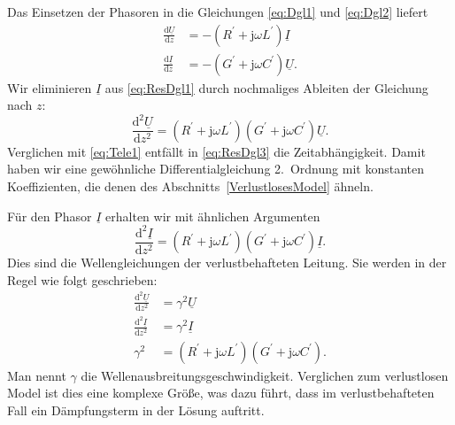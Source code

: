 \documentclass[paper=a4, parskip=half-, ngerman, fontsize=11pt]{scrreprt}
\begin{document}
Das Einsetzen der Phasoren in die Gleichungen \eqref{eq:Dgl1} und \eqref{eq:Dgl2} liefert
\begin{align}
    \frac{\text{d} \underline{U}}{\text{d} z} &= - \left( R^{\prime} + \mathrm{j} \omega L^{\prime} \right)
    \underline{I} \label{eq:ResDgl1} \\[1ex]
    \frac{\text{d} \underline{I}}{\text{d} z} &= - \left( G^{\prime} + \mathrm{j} \omega C^{\prime} \right)
    \underline{U}.
\end{align}
Wir eliminieren $\underline{I}$ aus \eqref{eq:ResDgl1} durch nochmaliges Ableiten der Gleichung nach $z$:
\begin{equation}
    \frac{\text{d}^{2} \underline{U}}{\text{d} z^{2}} = \left( R^{\prime} + \mathrm{j} \omega L^{\prime} \right)
    \left( G^{\prime} + \mathrm{j} \omega C^{\prime} \right) \underline{U} \label{eq:ResDgl3}.
\end{equation}
Verglichen mit \eqref{eq:Tele1} entfällt in \eqref{eq:ResDgl3} die Zeitabhängigkeit. Damit haben wir eine gewöhnliche
Differentialgleichung 2.~Ordnung mit konstanten Koeffizienten, die denen des Abschnitts~\ref{VerlustlosesModel} ähneln.

Für den Phasor $\underline{I}$ erhalten wir mit ähnlichen Argumenten
\begin{equation*}
    \frac{\text{d}^{2} \underline{I}}{\text{d} z^{2}} = \left( R^{\prime} + \mathrm{j} \omega L^{\prime} \right)
    \left( G^{\prime} + \mathrm{j} \omega C^{\prime} \right) \underline{I}.
\end{equation*}
Dies sind die Wellengleichungen der verlustbehafteten Leitung. Sie werden in der Regel wie folgt geschrieben:
\begin{align}
    \frac{\text{d}^{2} \underline{U}}{\text{d} z^{2}} &= \gamma^{2} \underline{U} \label{eq:VerlustDgl1} \\[1ex]
    \frac{\text{d}^{2} \underline{I}}{\text{d} z^{2}} &= \gamma^{2} \underline{I} \label{eq:VerlustDgl2} \\[1ex]
    \gamma^{2} &= \left( R^{\prime} + \mathrm{j} \omega L^{\prime} \right) \left( G^{\prime} + \mathrm{j} \omega
    C^{\prime} \right) \label{eq:Gamma}.
\end{align}
Man nennt $\gamma$ die Wellenausbreitungsgeschwindigkeit. Verglichen zum verlustlosen Model ist dies eine komplexe
Größe, was dazu führt, dass im verlustbehafteten Fall ein Dämpfungsterm in der Lösung auftritt.
\end{document}
